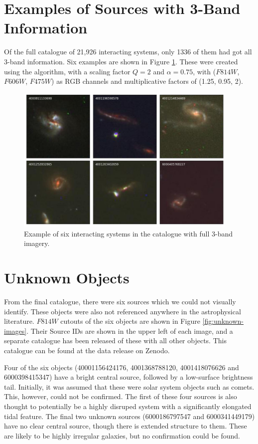 \section{Examples of Sources with 3-Band Information}\label{colour-images}
\noindent Of the full catalogue of 21,926 interacting systems, only 1336 of them had got all 3-band information. Six examples are shown in Figure \ref{fig:colour-images}. These were created using the \citet{2004PASP..116..133L} algorithm, with a scaling factor $Q = 2$ and $\alpha = 0.75$, with ($F814W$, $F606W$, $F475W$) as RGB channels and multiplicative factors of (1.25, 0.95, 2).

\begin{figure}
  \centering
  \includegraphics[width = 0.95\textwidth]{Chapter2/figures/fig16.jpeg}
  \caption{Example of six interacting systems in the catalogue with full 3-band imagery.}
  \label{fig:colour-images}
\end{figure}

\section{Unknown Objects}\label{unknown-object}
\noindent From the final catalogue, there were six sources which we could not visually identify. These objects were also not referenced anywhere in the astrophysical literature. $F814W$ cutouts of the six objects are shown in Figure \ref{fig:unknown-images}. Their Source IDs are shown in the upper left of each image, and a separate catalogue has been released of these with all other objects. This catalogue can be found at the data release on Zenodo.

Four of the six objects (40001156424176, 4001368788120, 4001418076626 and 6000398415347) have a bright central source, followed by a low-surface brightness tail. Initially, it was assumed that these were solar system objects such as comets. This, however, could not be confirmed. The first of these four sources is also thought to potentially be a highly disruped system with a significantly elongated tidal feature. The final two unknown sources (6000186797547 and 6000341449179) have no clear central source, though there is extended structure to them. These are likely to be highly irregular galaxies, but no confirmation could be found.

